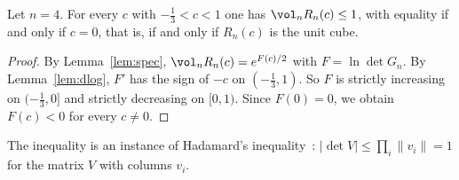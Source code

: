 \begin{theorem}\label{thm:main}
Let $n=4$. For every $c$ with $- \frac{1}{3}<c<1$ one has $\vol_nR_n(c)\le1$, with equality if and only if $c=0$, that is, if and only if $R_n(c)$ is the unit cube.
\end{theorem}
\begin{proof}
By Lemma~\ref{lem:spec}, $\vol_nR_n(c)=e^{F(c)/2}$ with $F=\ln\det G_n$.
By Lemma~\ref{lem:dlog}, $F'$ has the sign of $-c$ on $(- \frac{1}{3},1)$.
So $F$ is strictly increasing on $(- \frac{1}{3},0]$ and strictly decreasing on $[0,1)$.
Since $F(0)=0$, we obtain $F(c)<0$ for every $c\ne0$.
\end{proof}
\begin{remark}
The inequality is an instance of Hadamard's inequality~\cite{hadamard}: $|\det V|\le\prod_i\|v_i\|=1$ for the matrix $V$ with columns $v_i$.
\end{remark}
